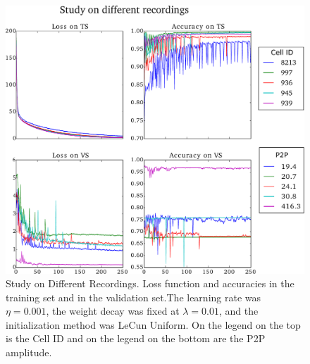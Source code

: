 \documentclass{article}
\begin{document}
\begin{figure}[H]
	\centering
	\includegraphics[width=\linewidth]{study_on_different_cells_v2.pdf}
	\caption{Study on Different Recordings. Loss function and accuracies in the training set and in the validation set.The learning rate was $\eta = 0.001$, the weight decay was fixed at $\lambda = 0.01$, and the initialization method was LeCun Uniform. On the legend on the top is the Cell ID and on the legend on the bottom are the P2P amplitude.
}
\label{fig:study-cells}
\end{figure}
\end{document}
